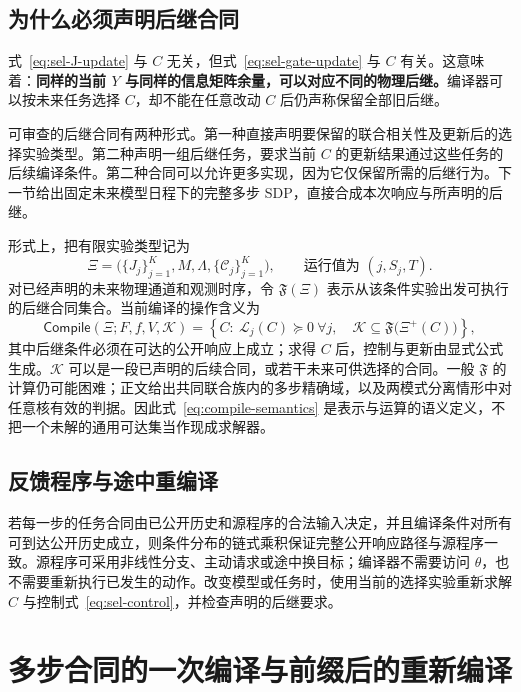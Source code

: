 \documentclass[UTF8,fontset=fandol,11pt,a4paper]{ctexart}
\theoremstyle{definition}
\theoremstyle{remark}
\numberwithin{equation}{section}
\begin{document}
\subsection{为什么必须声明后继合同}
式~\eqref{eq:sel-J-update} 与 $C$ 无关，但式~\eqref{eq:sel-gate-update} 与 $C$ 有关。这意味着：\textbf{同样的当前 $Y$ 与同样的信息矩阵余量，可以对应不同的物理后继。}编译器可以按未来任务选择 $C$，却不能在任意改动 $C$ 后仍声称保留全部旧后继。

可审查的后继合同有两种形式。第一种直接声明要保留的联合相关性及更新后的选择实验类型。第二种声明一组后继任务，要求当前 $C$ 的更新结果通过这些任务的后续编译条件。第二种合同可以允许更多实现，因为它仅保留所需的后继行为。下一节给出固定未来模型日程下的完整多步 SDP，直接合成本次响应与所声明的后继。

形式上，把有限实验类型记为
\begin{equation}
 \Xi=\bigl(\{J_j\}_{j=1}^K,M,\Lambda,\{\mathcal C_j\}_{j=1}^K\bigr),
 \qquad \text{运行值为 }(j,S_j,T).
\end{equation}
对已经声明的未来物理通道和观测时序，令 $\mathfrak F(\Xi)$ 表示从该条件实验出发可执行的后继合同集合。当前编译的操作含义为
\begin{equation}
 \mathsf{Compile}(\Xi;F,f,V,\mathcal K)
 =\left\{C:\ \mathcal L_j(C)\succeq0\ \forall j,\quad
 \mathcal K\subseteq\mathfrak F\bigl(\Xi^+(C)\bigr)\right\},
 \label{eq:compile-semantics}
\end{equation}
其中后继条件必须在可达的公开响应上成立；求得 $C$ 后，控制与更新由显式公式生成。$\mathcal K$ 可以是一段已声明的后续合同，或若干未来可供选择的合同。一般 $\mathfrak F$ 的计算仍可能困难；正文给出共同联合族内的多步精确域，以及两模式分离情形中对任意核有效的判据。因此式~\eqref{eq:compile-semantics} 是表示与运算的语义定义，不把一个未解的通用可达集当作现成求解器。

\subsection{反馈程序与途中重编译}
若每一步的任务合同由已公开历史和源程序的合法输入决定，并且编译条件对所有可到达公开历史成立，则条件分布的链式乘积保证完整公开响应路径与源程序一致。源程序可采用非线性分支、主动请求或途中换目标；编译器不需要访问 $\theta$，也不需要重新执行已发生的动作。改变模型或任务时，使用当前的选择实验重新求解 $C$ 与控制式~\eqref{eq:sel-control}，并检查声明的后继要求。

\section{多步合同的一次编译与前缀后的重新编译}
\label{sec:sel-horizon}
\end{document}
